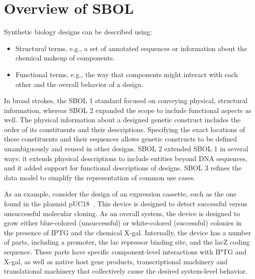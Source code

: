 \section{Overview of SBOL}

Synthetic biology designs can be described using:
\begin{itemize}
\item Structural terms, e.g., a set of annotated sequences or information about the chemical makeup of components.
\item Functional terms, e.g., the way that components might interact with each other and the overall behavior of a design.
\end{itemize}
In broad strokes, the SBOL 1 standard focused on conveying physical, structural information, whereas SBOL 2 expanded the scope to include functional aspects as well.  The physical information about a designed genetic construct includes the order of its constituents and their descriptions. Specifying the exact locations of these constituents and their sequences allows genetic constructs to be defined unambiguously and reused in other designs. SBOL 2 extended SBOL 1 in several ways: it extends physical descriptions to include entities beyond DNA sequences, and it added support for functional descriptions of designs.  SBOL 3 refines the data model to simplify the representation of common use cases.

As an example, consider the design of an expression cassette, such as the one found in the plasmid pUC18~\cite{L08752.1}. This device is designed to detect successful versus unsuccessful molecular cloning.  As an overall system, the device is designed to grow either blue-colored (unsuccessful) or white-colored (successful) colonies in the presence of IPTG and the chemical X-gal. Internally, the device has a number of parts, including a promoter, the lac repressor binding site, and the lacZ coding sequence. 
These parts have specific component-level interactions with IPTG and X-gal, as well as native host gene products, transcriptional machinery and translational machinery that collectively cause the desired system-level behavior. 

